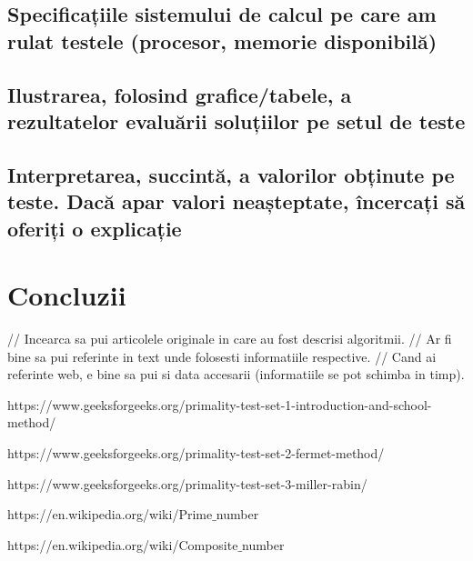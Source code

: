 \documentclass[runningheads]{llncs}
\begin{document}
\subsection{Specificațiile sistemului de calcul pe care am rulat testele (procesor, memorie disponibilă)}



\subsection{Ilustrarea, folosind grafice/tabele, a rezultatelor evaluării soluțiilor pe setul de teste}



\subsection{Interpretarea, succintă, a valorilor obținute pe teste. Dacă apar valori neașteptate, încercați să oferiți o explicație}



\section{Concluzii}

// Incearca sa pui articolele originale in care au fost descrisi algoritmii.
// Ar fi bine sa pui referinte in text unde folosesti informatiile respective.
// Cand ai referinte web, e bine sa pui si data accesarii (informatiile se pot schimba in timp).

\begin{thebibliography}{8}
https://www.geeksforgeeks.org/primality-test-set-1-introduction-and-school-method/

https://www.geeksforgeeks.org/primality-test-set-2-fermet-method/

https://www.geeksforgeeks.org/primality-test-set-3-miller-rabin/

https://en.wikipedia.org/wiki/Prime$\_$number

https://en.wikipedia.org/wiki/Composite$\_$number

\end{thebibliography}
\end{document}

